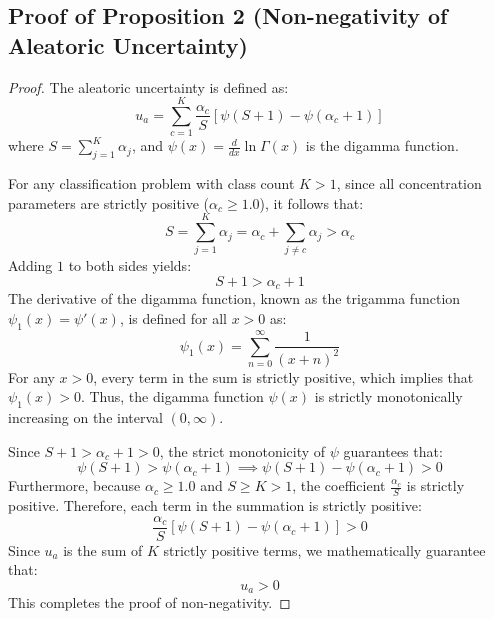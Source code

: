 \documentclass[letterpaper]{article} %
\begin{document}
\subsection{Proof of Proposition 2 (Non-negativity of Aleatoric Uncertainty)}
\begin{proof}
The aleatoric uncertainty is defined as:
\begin{equation}
    u_a = \sum_{c=1}^K \frac{\alpha_c}{S} \left[\psi(S + 1) - \psi(\alpha_c + 1)\right]
\end{equation}
where $S = \sum_{j=1}^K \alpha_j$, and $\psi(x) = \frac{d}{dx} \ln \Gamma(x)$ is the digamma function.

For any classification problem with class count $K > 1$, since all concentration parameters are strictly positive ($\alpha_c \ge 1.0$), it follows that:
\begin{equation}
    S = \sum_{j=1}^K \alpha_j = \alpha_c + \sum_{j \ne c} \alpha_j > \alpha_c
\end{equation}
Adding $1$ to both sides yields:
\begin{equation}
    S + 1 > \alpha_c + 1
\end{equation}
The derivative of the digamma function, known as the trigamma function $\psi_1(x) = \psi'(x)$, is defined for all $x > 0$ as:
\begin{equation}
    \psi_1(x) = \sum_{n=0}^{\infty} \frac{1}{(x + n)^2}
\end{equation}
For any $x > 0$, every term in the sum is strictly positive, which implies that $\psi_1(x) > 0$. Thus, the digamma function $\psi(x)$ is strictly monotonically increasing on the interval $(0, \infty)$. 

Since $S + 1 > \alpha_c + 1 > 0$, the strict monotonicity of $\psi$ guarantees that:
\begin{equation}
    \psi(S + 1) > \psi(\alpha_c + 1) \implies \psi(S + 1) - \psi(\alpha_c + 1) > 0
\end{equation}
Furthermore, because $\alpha_c \ge 1.0$ and $S \ge K > 1$, the coefficient $\frac{\alpha_c}{S}$ is strictly positive. Therefore, each term in the summation is strictly positive:
\begin{equation}
    \frac{\alpha_c}{S} \left[\psi(S + 1) - \psi(\alpha_c + 1)\right] > 0
\end{equation}
Since $u_a$ is the sum of $K$ strictly positive terms, we mathematically guarantee that:
\begin{equation}
    u_a > 0
\end{equation}
This completes the proof of non-negativity.
\end{proof}
\end{document}

